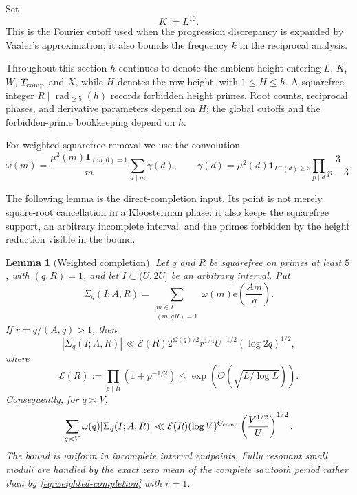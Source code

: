 \documentclass[11pt]{article}
\newtheorem{lemma}[lemma]{Lemma}
\theoremstyle{definition}
\theoremstyle{remark}
\newcommand{\Ecal}{\mathcal E}
\newcommand{\rad}{\operatorname{rad}}
\newcommand{\e}{\mathrm e}
\newcommand{\1}{\mathbf 1}
\newcommand{\Om}{\Omega}
\newcommand{\om}{\omega}
\begin{document}
Set
\[
K:=L^{10}.
\]
This is the Fourier cutoff used when the progression discrepancy is expanded by Vaaler's approximation; it also bounds the frequency $k$ in the reciprocal analysis.

Throughout this section $h$ continues to denote the ambient height entering $L$, $K$, $W$, $T_{\rm comp}$ and $X$, while $H$ denotes the row height, with $1\le H\le h$.  A squarefree integer $R\mid\rad_{\ge5}(h)$ records forbidden height primes.  Root counts, reciprocal phases, and derivative parameters depend on $H$; the global cutoffs and the forbidden-prime bookkeeping depend on $h$.

For weighted squarefree removal we use the convolution
\begin{equation}\label{eq:omega-convolution}
\om(m)=\frac{\mu^2(m)\1_{(m,6)=1}}{m}
 \sum_{d\mid m}\gamma(d),
\qquad
\gamma(d)=\mu^2(d)\1_{P^-(d)\ge5}
 \prod_{p\mid d}\frac3{p-3}.
\end{equation}

The following lemma is the direct-completion input.  Its point is not merely square-root cancellation in a Kloosterman phase: it also keeps the squarefree support, an arbitrary incomplete interval, and the primes forbidden by the height reduction visible in the bound.

\begin{lemma}[Weighted completion]\label{lem:weighted-completion}
Let $q$ and $R$ be squarefree on primes at least $5$, with $(q,R)=1$, and let $I\subset(U,2U]$ be an arbitrary interval.  Put
\[
\Sigma_q(I;A,R)
 =\sum_{\substack{m\in I\\(m,qR)=1}}
 \om(m)\e\!\left(\frac{A\bar m}{q}\right).
\]
If $r=q/(A,q)>1$, then
\begin{equation}\label{eq:weighted-completion}
|\Sigma_q(I;A,R)|
 \ll \Ecal(R)2^{\Om(q)/2}r^{1/4}U^{-1/2}(\log 2q)^{1/2},
\end{equation}
where
\begin{equation}\label{eq:forbidden-surcharge}
\Ecal(R):=\prod_{p\mid R}(1+p^{-1/2})
 \le \exp\!\left(O\!\left(\sqrt{L/\log L}\right)\right).
\end{equation}
Consequently, for $q\asymp V$,
\begin{equation}\label{eq:completion-block}
\sum_{q\asymp V}\om(q)|\Sigma_q(I;A,R)|
 \ll \Ecal(R)(\log V)^{C_{\rm comp}}
       \left(\frac{V^{1/2}}U\right)^{1/2}.
\end{equation}
The bound is uniform in incomplete interval endpoints.  Fully resonant small moduli are handled by the exact zero mean of the complete sawtooth period rather than by \cref{eq:weighted-completion} with $r=1$.
\end{lemma}
\end{document}
